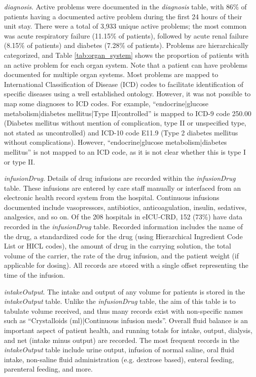 \documentclass[english]{article}
\newcommand{\tblname}[1]{\emph{#1}}
\begin{document}
\tblname{diagnosis}. Active problems were documented in the \tblname{diagnosis} table,
with 86\% of patients having a documented active problem during
the first 24 hours of their unit stay. There were a total of 3,933
unique active problems; the most common was acute respiratory failure
(11.15\% of patients), followed by acute renal failure (8.15\% of
patients) and diabetes (7.28\% of patients). Problems are hierarchically
categorized, and Table \ref{tab:organ_system} shows the proportion of patients with an active problem for each organ system. Note that a patient can have problems
documented for multiple organ systems.
Most problems are mapped to International Classification of Disease (ICD) codes to facilitate identification of specific diseases using a well established ontology. However, it was not possible to map some diagnoses to ICD codes. For example, ``endocrine|glucose metabolism|diabetes mellitus|Type II|controlled'' is mapped to ICD-9 code 250.00 (Diabetes mellitus without mention of complication, type II or unspecified type, not stated as uncontrolled) and ICD-10 code E11.9 (Type 2 diabetes mellitus without complications).
However, ``endocrine|glucose metabolism|diabetes mellitus'' is not mapped to an ICD code, as it is not clear whether this is type I or type II.

\tblname{infusionDrug}. Details of drug infusions are recorded within the \tblname{infusionDrug} table. These infusions are entered by care staff manually or interfaced from an electronic health record system from the hospital. Continuous infusions documented include vasopressors, antibiotics, anticoagulation, insulin, sedatives, analgesics, and so on. Of the 208 hospitals in eICU-CRD, 152 (73\%) have data recorded in the \tblname{infusionDrug} table. Recorded information includes the name of the drug, a standardized code for the drug (using Hierarchical Ingredient Code List or HICL codes), the amount of drug in the carrying solution, the total volume of the carrier, the rate of the drug infusion, and the patient weight (if applicable for dosing). All records are stored with a single offset representing the time of the infusion.

\tblname{intakeOutput}. The intake and output of any volume for patients is stored in the \tblname{intakeOutput} table. Unlike the \tblname{infusionDrug} table, the aim of this table is to tabulate volume received, and thus many records exist with non-specific names such as ``Crystalloids (ml)|Continuous infusion meds''.
Overall fluid balance is an important aspect of patient health, and running totals for intake, output, dialysis, and net (intake minus output) are recorded. The most frequent records in the \tblname{intakeOutput} table include urine output, infusion of normal saline, oral fluid intake, non-saline fluid administration (e.g. dextrose based), enteral feeding, parenteral feeding, and more.
\end{document}
